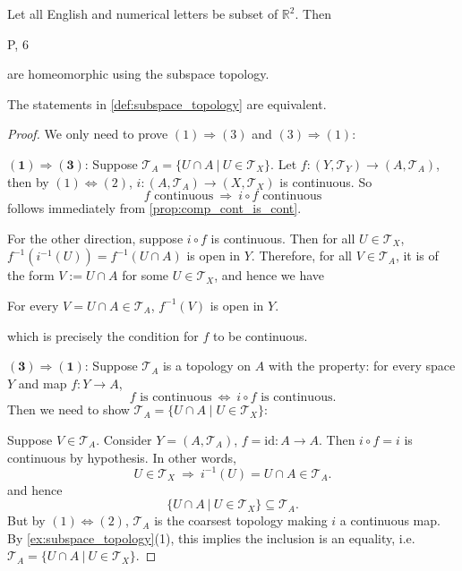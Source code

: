 \begin{example} Let all English and numerical letters be subset of \({\mathbb{R}}^{2}\). Then
\begin{center}
P, 6
\end{center}
are homeomorphic using the subspace topology.
\end{example}

\begin{proposition} \label{prop:subspace_equivalent} The statements in \autoref{def:subspace_topology} are equivalent.
\end{proposition}
\begin{proof} 
We only need to prove $(1) \Rightarrow (3)$ and $(3) \Rightarrow (1)$:


\(\mathbf{(1) \Rightarrow (3)}\): Suppose \(\mathcal{T}_A = \{U \cap A\ |\ U \in \mathcal{T}_X\}\). Let \(f: (Y, \mathcal{T}_Y) \to (A, \mathcal{T}_A)\), then by $(1) \Leftrightarrow (2)$, $i: (A, \mathcal{T}_A) \to (X,\mathcal{T}_X)$ is continuous. So 
$$f \text{ continuous}\ \Rightarrow\ i \circ f \text{ continuous}$$
follows immediately from \autoref{prop:comp_cont_is_cont}.

For the other direction, suppose $i \circ f$ is continuous. Then
for all \(U \in \mathcal{T}_X\), \(f^{-1}(i^{-1}(U)) = f^{-1}(U \cap A)\) is open in \(Y\). Therefore, for all $V \in \mathcal{T}_A$, it is of the form $V := U \cap A$ for some $U \in \mathcal{T}_X$, and hence we have
\begin{center}
For every \(V = U \cap A \in \mathcal{T}_A\), \(f^{-1}(V)\) is open in \(Y\).
\end{center}
which is precisely the condition for $f$ to be continuous.


\(\mathbf{(3) \Rightarrow (1)}\): Suppose \(\mathcal{T}_A\) is a topology on \(A\) with the property: for every space \(Y\) and map \(f: Y \to A\),
\[
f \text{ is continuous}\ \Leftrightarrow\ i \circ f \text{ is continuous}.
\]
Then we need to show \(\mathcal{T}_A = \{U \cap A \mid U \in \mathcal{T}_X\}\):

Suppose \(V \in \mathcal{T}_A\). Consider \(Y = (A, \mathcal{T}_A)\), \(f = \mathrm{id}: A \to A\). Then \(i \circ f = i\) is continuous by hypothesis. In other words,
$$U \in \mathcal{T}_X \ \Rightarrow\ i^{-1}(U) = U \cap A \in \mathcal{T}_A.$$
and hence 
$$\{U \cap A\ |\ U \in \mathcal{T}_X\} \subseteq \mathcal{T}_A.$$
But by $(1) \Leftrightarrow (2)$, $\mathcal{T}_A$ is the coarsest topology making $i$ a continuous map. By \autoref{ex:subspace_topology}(1), this implies the inclusion is an equality, i.e. $\mathcal{T}_A = \{ U \cap A\ |\ U \in \mathcal{T}_X\}$.
\end{proof}

